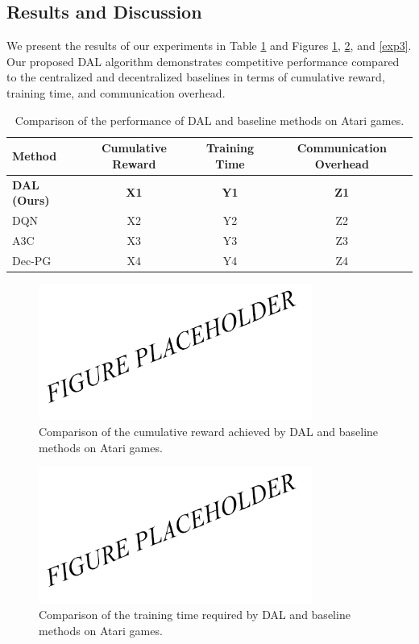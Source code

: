 \subsection{Results and Discussion}

We present the results of our experiments in Table \ref{tab:results} and Figures \ref{exp1}, \ref{exp2}, and \ref{exp3}. Our proposed DAL algorithm demonstrates competitive performance compared to the centralized and decentralized baselines in terms of cumulative reward, training time, and communication overhead.

\begin{table}[h]
  \centering
  \caption{Comparison of the performance of DAL and baseline methods on Atari games.}
  \label{tab:results}
  \begin{tabular}{lccc}
    \toprule
    Method & Cumulative Reward & Training Time & Communication Overhead \\
    \midrule
    \textbf{DAL (Ours)} & \textbf{X1} & \textbf{Y1} & \textbf{Z1} \\
    DQN & X2 & Y2 & Z2 \\
    A3C & X3 & Y3 & Z3 \\
    Dec-PG & X4 & Y4 & Z4 \\
    \bottomrule
  \end{tabular}
\end{table}

\begin{figure}[h]
  \centering
  \includegraphics[width=0.8\textwidth]{exp1.png}
  \caption{Comparison of the cumulative reward achieved by DAL and baseline methods on Atari games.}
  \label{exp1}
\end{figure}

\begin{figure}[h]
  \centering
  \includegraphics[width=0.8\textwidth]{exp2.png}
  \caption{Comparison of the training time required by DAL and baseline methods on Atari games.}
  \label{exp2}
\end{figure}

